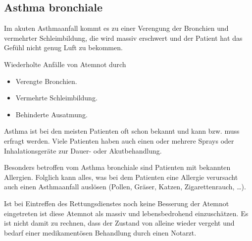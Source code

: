 \subsection{Asthma bronchiale}
\label{topic:asthma-bronchiale}



{
Im akuten Asthmaanfall kommt es zu einer Verengung der
Bronchien und vermehrter Schleimbildung, die 
wird massiv erschwert und der Patient hat das Gefühl nicht genug Luft zu bekommen.
}{%
Wiederholte Anfälle von Atemnot durch

\begin{itemize}
  \item Verengte Bronchien.
  \item Vermehrte Schleimbildung.
  \item Behinderte Ausatmung.
\end{itemize}
}
{}
{}
{}





Asthma ist bei den meisten Patienten oft schon bekannt und
kann bzw. muss erfragt werden. Viele Patienten haben auch
einen oder mehrere Sprays oder Inhalationsgeräte zur Dauer-
oder Akutbehandlung. 


Besonders betroffen vom Asthma bronchiale sind Patienten
mit bekannten Allergien. Folglich kann alles, was bei dem
Patienten eine Allergie verursacht auch einen Asthmaanfall
auslösen (Pollen, Gräser, Katzen, Zigarettenrauch, \ldots). 

Ist bei Eintreffen des Rettungsdienstes noch keine
Besserung der Atemnot eingetreten ist diese Atemnot als
massiv und lebensbedrohend einzuschätzen. Es ist nicht
damit zu rechnen, dass der Zustand von alleine wieder
vergeht und bedarf einer medikamentösen Behandlung durch einen
Notarzt. 

